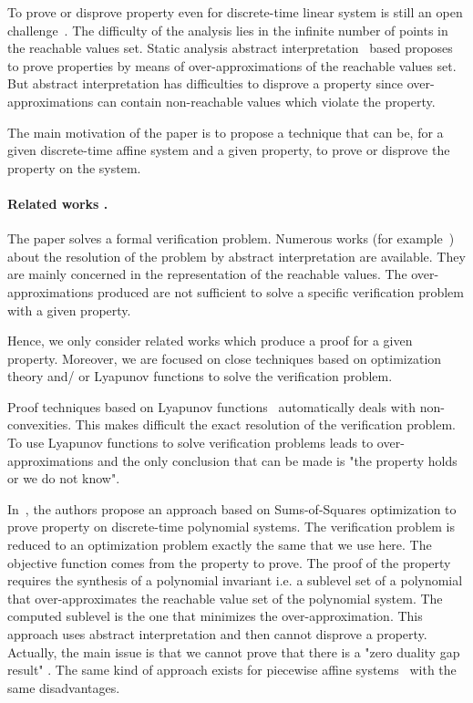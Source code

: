 \documentclass[10pt]{llncs}
\begin{document}
To prove or disprove property even for discrete-time linear system is still an open challenge~\cite{acceleration-popl14,7403149,DBLP:conf/icalp/AlmagorCO018}.  The difficulty of the analysis lies in the infinite number of points in the reachable values set. Static analysis abstract interpretation~\cite{cousot2001abstract} based proposes to prove properties by means of over-approximations of the reachable values set. But abstract interpretation has difficulties to disprove a property since over-approximations can contain non-reachable values which violate the property.

The main motivation of the paper is to propose a technique that can be, for a given discrete-time affine system and a given property, to prove or disprove the property on the system.    

\paragraph{Related works .} 
The paper solves a formal verification problem. Numerous works (for example~\cite{DBLP:journals/corr/abs-1111-5223,gonnord2014abstract,mine-ESOP16,Sankaranarayanan_BenSassi__2017__Template}) about the resolution of the problem by abstract interpretation are available. They are mainly concerned in the representation of the reachable values. The over-approximations produced are not sufficient to solve a specific verification problem with a given property.

Hence, we only consider related works which produce a proof for a given property. Moreover, we are focused on close techniques based on optimization theory and/ or Lyapunov functions to solve the verification problem. 

Proof techniques based on Lyapunov functions~\cite{roozbehani2013optimization,blanchini2009lyapunov} automatically deals with non-convexities. This makes difficult the exact resolution of the verification problem. To use Lyapunov functions to solve verification problems leads  to over-approximations and the only conclusion that can be made is "the property holds or we do not know".

In~\cite{adje2015property}, the authors propose  an approach based on Sums-of-Squares optimization to prove property on discrete-time polynomial systems. The verification problem is reduced to an optimization problem exactly the same that we use here.  The objective function comes from the property to prove. The proof of the property requires the synthesis of a polynomial invariant i.e.  a sublevel set of a polynomial that over-approximates the reachable value set of the polynomial system. The computed sublevel is the one that minimizes the over-approximation. This approach uses abstract interpretation and then cannot disprove a property. Actually, the main issue is that we cannot prove that there is a "zero duality gap result" . The same kind of approach exists for piecewise affine systems~\cite{10.1007/978-3-319-54292-8_2} with the same disadvantages. 
\end{document}
